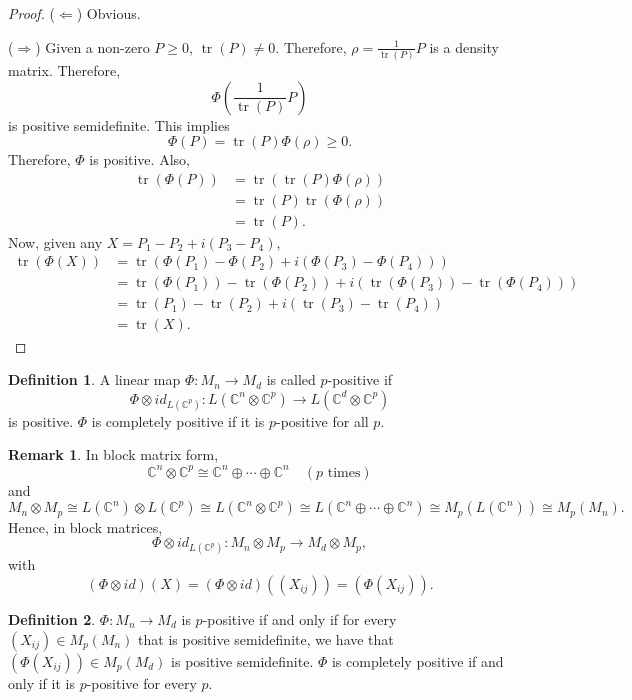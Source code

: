 \documentclass[12pt]{article}
\theoremstyle{definition}
\newtheorem*{definition}{Definition}
\newtheorem*{remark}{Remark}
\DeclareMathOperator{\tr}{tr}
\newcommand{\C}{\mathbb{C}}
\begin{document}
\begin{proof}
($\Leftarrow$) Obvious.

($\Rightarrow$) Given a non-zero $P \geq 0$, $\tr(P) \neq 0$. Therefore, $\rho = \frac{1}{\tr(P)}P$ is a density matrix. Therefore,
\[
\Phi\left(\frac{1}{\tr(P)}P\right)
\]
is positive semidefinite. This implies
\[
\Phi(P) = \tr(P)\Phi(\rho) \geq 0.
\]
Therefore, $\Phi$ is positive. Also,
\begin{align*}
\tr(\Phi(P)) &= \tr(\tr(P)\Phi(\rho)) \\
&= \tr(P)\tr(\Phi(\rho)) \\
&= \tr(P).
\end{align*}
Now, given any $X=P_1-P_2+i(P_3-P_4)$,
\begin{align*}
\tr(\Phi(X)) &= \tr(\Phi(P_1)-\Phi(P_2)+i(\Phi(P_3)-\Phi(P_4))) \\
&= \tr(\Phi(P_1)) - \tr(\Phi(P_2)) + i(\tr(\Phi(P_3)) - \tr(\Phi(P_4))) \\
&= \tr(P_1)-\tr(P_2)+i(\tr(P_3)-\tr(P_4)) \\
&= \tr(X).
\end{align*}
\end{proof}

\begin{definition}
A linear map $\Phi:M_n \to M_d$ is called $p$-positive if
\[
\Phi \otimes id_{L(\C^p)} : L(\C^n \otimes \C^p) \to L(\C^d \otimes \C^p)
\]
is positive. $\Phi$ is completely positive if it is $p$-positive for all $p$.
\end{definition}

\begin{remark}
In block matrix form,
\[
\C^n \otimes \C^p \cong \C^n \oplus \cdots \oplus \C^n \quad (p \text{ times})
\]
and
\[
M_n \otimes M_p \cong L(\C^n) \otimes L(\C^p) \cong L(\C^n \otimes \C^p) \cong L(\C^n \oplus \cdots \oplus \C^n) \cong M_p(L(\C^n)) \cong M_p(M_n).
\]
Hence, in block matrices,
\[
\Phi \otimes id_{L(\C^p)} : M_n \otimes M_p \to M_d \otimes M_p,
\]
with
\[
(\Phi \otimes id)(X) = (\Phi \otimes id)((X_{ij})) = (\Phi(X_{ij})).
\]
\end{remark}

\begin{definition}
$\Phi:M_n \to M_d$ is $p$-positive if and only if for every $(X_{ij}) \in M_p(M_n)$ that is positive semidefinite, we have that $(\Phi(X_{ij})) \in M_p(M_d)$ is positive semidefinite. $\Phi$ is completely positive if and only if it is $p$-positive for every $p$.
\end{definition}
\end{document}
